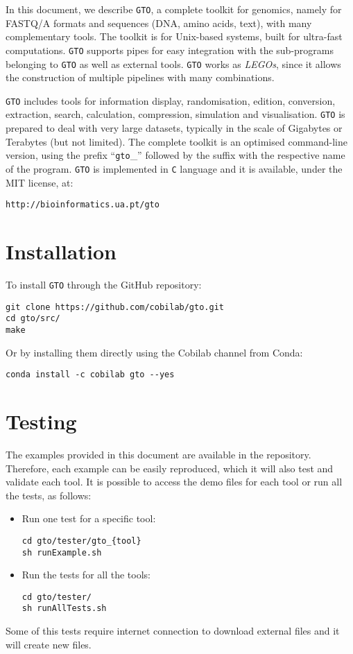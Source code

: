 In this document, we describe \texttt{GTO}, a complete toolkit for genomics, namely for FASTQ/A formats and sequences (DNA, amino acids, text), with many complementary tools. The toolkit is for Unix-based systems, built for ultra-fast computations. \texttt{GTO} supports pipes for easy integration with the sub-programs belonging to \texttt{GTO} as well as external tools. \texttt{GTO} works as \textit{LEGOs}, since it allows the construction of multiple pipelines with many combinations.

\texttt{GTO} includes tools for information display, randomisation, edition, conversion, extraction, search, calculation, compression, simulation and visualisation. \texttt{GTO} is prepared to deal with very large datasets, typically in the scale of Gigabytes or Terabytes (but not limited).
The complete toolkit is an optimised command-line version, using the prefix ``\texttt{gto}\_'' followed by the suffix with the respective name of the program. \texttt{GTO} is implemented in \texttt{C} language and it is available, under the MIT license, at:
\begin{lstlisting}
http://bioinformatics.ua.pt/gto
\end{lstlisting}

\section{Installation}
To install \texttt{GTO} through the GitHub repository:
\begin{lstlisting}
git clone https://github.com/cobilab/gto.git
cd gto/src/
make
\end{lstlisting}
Or by installing them directly using the Cobilab channel from Conda:
\begin{lstlisting}
conda install -c cobilab gto --yes
\end{lstlisting}


\section{Testing}
The examples provided in this document are available in the repository. Therefore, each example can be easily reproduced, which it will also test and validate each tool. It is possible to access the demo files for each tool or run all the tests, as follows:
\begin{itemize}
	\item Run one test for a specific tool:
\begin{lstlisting}
cd gto/tester/gto_{tool}
sh runExample.sh
\end{lstlisting}
\item Run the tests for all the tools:
\begin{lstlisting}
cd gto/tester/
sh runAllTests.sh
\end{lstlisting}
\end{itemize}
Some of this tests require internet connection to download external files and it will create new files.

